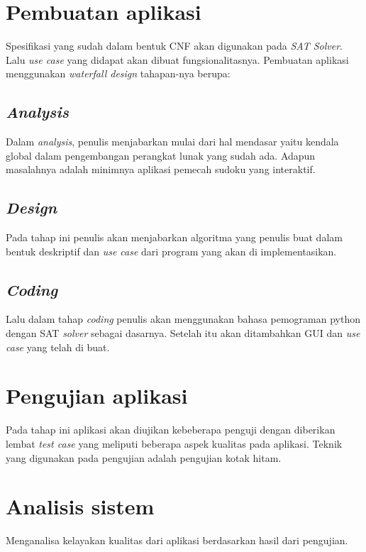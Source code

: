 \section{Pembuatan aplikasi}

Spesifikasi yang sudah dalam bentuk CNF akan digunakan pada \textit{SAT Solver}. Lalu \textit{use case} yang didapat akan dibuat fungsionalitasnya. Pembuatan aplikasi menggunakan \textit{waterfall design} tahapan-nya berupa:

\subsection{\textit{Analysis}}

Dalam \textit{analysis}, penulis menjabarkan mulai dari hal
mendasar yaitu kendala global dalam pengembangan perangkat lunak yang sudah ada. Adapun masalahnya adalah minimnya aplikasi pemecah sudoku yang interaktif.

\subsection{\textit{Design}}

Pada tahap ini penulis akan menjabarkan algoritma yang
penulis buat dalam bentuk deskriptif dan \textit{use case} dari program yang akan di implementasikan. 

\subsection{\textit{Coding}}

Lalu dalam tahap \textit{coding} penulis akan menggunakan
bahasa pemograman python dengan SAT \textit{solver}\cite{SATPy2} sebagai dasarnya. Setelah itu akan ditambahkan GUI dan \textit{use case} yang telah di buat.

\section{Pengujian aplikasi}

Pada tahap ini aplikasi akan diujikan kebeberapa penguji dengan diberikan lembat \textit{test case} yang meliputi beberapa aspek kualitas pada aplikasi. Teknik yang digunakan pada pengujian adalah pengujian kotak hitam\cite{TEST1}.

\section{Analisis sistem}

Menganalisa kelayakan kualitas dari aplikasi berdasarkan hasil dari pengujian.